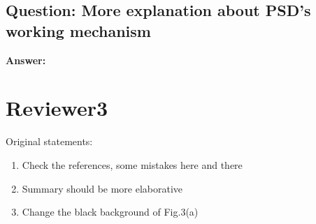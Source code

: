 \documentclass[]{article}
\begin{document}
\subsection{Question: More explanation about PSD's working mechanism}
\textbf{Answer:}\newline


\section{Reviewer3}
Original statements:
\begin{enumerate}
	\item Check the references, some mistakes here and there
	\item Summary should be more elaborative
	\item Change the black background of Fig.3(a)
\end{enumerate}
\end{document}
